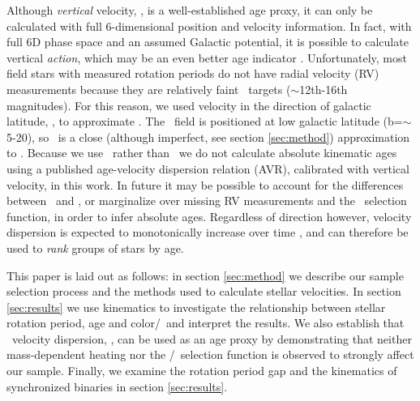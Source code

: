 Although {\it vertical} velocity, \vz, is a well-established age proxy, it can
only be calculated with full 6-dimensional position and velocity information.
In fact, with full 6D phase space and an assumed Galactic potential, it is
possible to calculate vertical {\it action}, which may be an even better age
indicator \citep{beane2018, ting2019}.
Unfortunately, most field stars with measured rotation periods do not have
radial velocity (RV) measurements because they are relatively faint \kepler\
targets ($\sim$12th-16th magnitudes).
For this reason, we used velocity in the direction of galactic latitude, \vb,
to approximate \vz.
The \kepler\ field is positioned at low galactic latitude
(b=$\sim$5-20\degrees), so \vb\ is a close (although imperfect, see section
\ref{sec:method}) approximation to \vz.
Because we use \vb\ rather than \vz\, we do not calculate absolute kinematic
ages using a published age-velocity dispersion relation (AVR), calibrated with
vertical velocity, in this work.
In future it may be possible to account for the differences between \vb\ and
\vz, or marginalize over missing RV measurements and the \kepler\ selection
function, in order to infer absolute ages.
Regardless of direction however, velocity dispersion is expected to
monotonically increase over time \citep[\eg][]{holmberg2009}, and can
therefore be used to {\it rank} groups of stars by age.

This paper is laid out as follows: in section \ref{sec:method} we describe our
sample selection process and the methods used to calculate stellar
velocities.
In section \ref{sec:results} we use kinematics to investigate the relationship
between stellar rotation period, age and color/\teff\ and interpret the
results.
We also establish that \vb\ velocity dispersion, \sigmavb, can be used as an
age proxy by demonstrating that neither mass-dependent heating nor the
\kepler/\gaia\ selection function is observed to strongly affect our sample.
Finally, we examine the rotation period gap and the kinematics of synchronized
binaries in section \ref{sec:results}.

